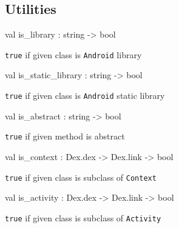 \documentclass[11pt]{article}
\begin{document}
\subsection{Utilities}




\label{val:Android.is-underscorelibrary}\begin{ocamldoccode}
val is_library : string -> bool
\end{ocamldoccode}
\begin{ocamldocdescription}
{\tt{true}} if given class is {\tt{Android}} library


\end{ocamldocdescription}




\label{val:Android.is-underscorestatic-underscorelibrary}\begin{ocamldoccode}
val is_static_library : string -> bool
\end{ocamldoccode}
\begin{ocamldocdescription}
{\tt{true}} if given class is {\tt{Android}} static library


\end{ocamldocdescription}




\label{val:Android.is-underscoreabstract}\begin{ocamldoccode}
val is_abstract : string -> bool
\end{ocamldoccode}
\begin{ocamldocdescription}
{\tt{true}} if given method is abstract


\end{ocamldocdescription}




\label{val:Android.is-underscorecontext}\begin{ocamldoccode}
val is_context : Dex.dex -> Dex.link -> bool
\end{ocamldoccode}
\begin{ocamldocdescription}
{\tt{true}} if given class is subclass of {\tt{Context}}


\end{ocamldocdescription}




\label{val:Android.is-underscoreactivity}\begin{ocamldoccode}
val is_activity : Dex.dex -> Dex.link -> bool
\end{ocamldoccode}
\begin{ocamldocdescription}
{\tt{true}} if given class is subclass of {\tt{Activity}}


\end{ocamldocdescription}
\end{document}
